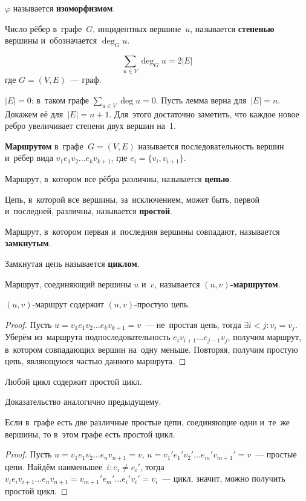 $\varphi$ называется \textbf{изоморфизмом}.

Число рёбер в~графе~$G$, инцидентных вершине~$u$, называется \textbf{степенью} вершины и~обозначается $\deg_G u$.


\begin{lemma}[о рукопожатиях]
	\[ \sum_{u \in V} \deg_G u = 2|E| \]
	где $G = (V, E)$~--- граф.
\end{lemma}
\begin{proofmathind}
	\indbase $|E| = 0$: в~таком графе $\displaystyle \sum_{u \in V} \deg u = 0$.
	\indstep Пусть лемма верна для~$|E| = n$.
	Докажем её для~$|E| = n + 1$.
	Для~этого достаточно заметить, что каждое новое ребро увеличивает степени двух вершин на~1.
	\indend
\end{proofmathind}


\textbf{Маршрутом} в~графе~$G = (V, E)$ называется последовательность вершин и~рёбер вида $v_1 e_1 v_2 \ldots e_k v_{k+1}$, где $e_i = \{ v_i, v_{i+1} \}$.

Маршрут, в~котором все рёбра различны, называется \textbf{цепью}.

Цепь, в~которой все вершины, за~исключением, может быть, первой и~последней, различны, называется \textbf{простой}.

Маршрут, в~котором первая и~последняя вершины совпадают, называется \textbf{замкнутым}.

Замкнутая цепь называется \textbf{циклом}.

Маршрут, соединяющий вершины $u$ и~$v$, называется \textbf{$(u, v)$\nobreakdash-\hspace{0pt}маршрутом}.


\begin{lemma}
	$(u, v)$\nobreakdash-\hspace{0pt}маршрут содержит $(u, v)$\nobreakdash-\hspace{0pt}простую цепь.
\end{lemma}
\begin{proof}
	Пусть $u = v_1 e_1 v_2 \ldots e_k v_{k+1} = v$~--- не~простая цепь, тогда $\exists i < j \colon v_i = v_j$.
	Уберём из~маршрута подпоследовательность $e_i v_{i+1} \ldots e_{j-1} v_j$, получим маршрут, в~котором совпадающих вершин на~одну меньше.
	Повторяя, получим простую цепь, являющуюся частью данного маршрута.
\end{proof}

\begin{lemma}
	Любой цикл содержит простой цикл.
\end{lemma}%
Доказательство аналогично предыдущему.

\begin{lemma}
	Если в~графе есть две различные простые цепи, соединяющие одни и~те~же вершины, то в~этом графе есть простой цикл.
\end{lemma}
\begin{proof}
	Пусть $u = v_1 e_1 v_2 \ldots e_n v_{n+1} = v$, $u = v_1' e_1' v_2' \ldots e_m' v_{m+1}' = v$~--- простые цепи.
	Найдём наименьшее~$i \colon e_i \neq e_i'$, тогда $v_i e_i v_{i+1} \ldots e_n v_{n+1} = v_{m+1}' e_m' \ldots e_i' v_i' = v_i$~--- цикл, значит, можно получить простой цикл.
\end{proof}



